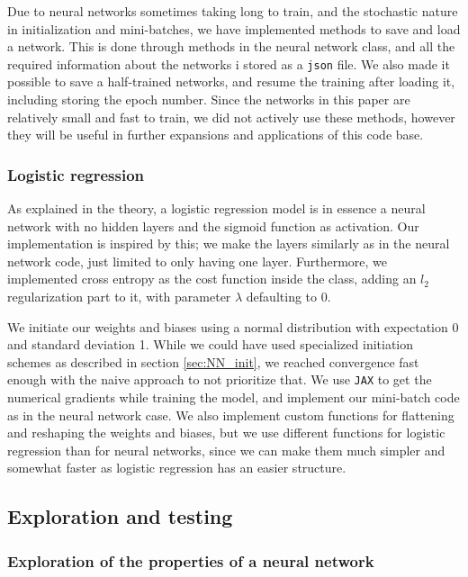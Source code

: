 Due to neural networks sometimes taking long to train, and the stochastic nature in initialization and mini-batches, we have implemented methods to save and load a network.
This is done through methods in the neural network class, and all the required information about the networks i stored as a \texttt{json} file.
We also made it possible to save a half-trained networks, and resume the training after loading it, including storing the epoch number.
Since the networks in this paper are relatively small and fast to train, we did not actively use these methods, however they will be useful in further expansions and applications of this code base.

\subsubsection{Logistic regression}

As explained in the theory, a logistic regression model is in essence a neural network with no hidden layers and the sigmoid function as activation.
Our implementation is inspired by this; we make the layers similarly as in the neural network code, just limited to only having one layer.
Furthermore, we implemented cross entropy as the cost function inside the class, adding an $l_2$ regularization part to it, with parameter $\lambda$ defaulting to 0.

We initiate our weights and biases using a normal distribution with expectation 0 and standard deviation 1.
While we could have used specialized initiation schemes as described in section \ref{sec:NN_init}, we reached convergence fast enough with the naive approach to not prioritize that.
We use \texttt{JAX} \cite{jax2018github} to get the numerical gradients while training the model, and implement our mini-batch code as in the neural network case.
We also implement custom functions for flattening and reshaping the weights and biases, but we use different functions for logistic regression than for neural networks, since we can make them much simpler and somewhat faster as logistic regression has an easier structure.

\subsection{Exploration and testing}
\subsubsection{Exploration of the properties of a neural network}

